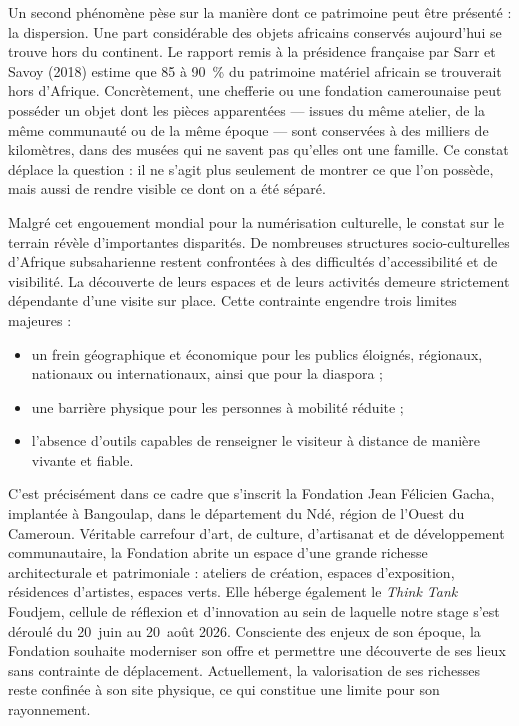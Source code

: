 Un second phénomène pèse sur la manière dont ce patrimoine peut être présenté :
la dispersion. Une part considérable des objets africains conservés aujourd'hui
se trouve hors du continent. Le rapport remis à la présidence française par
Sarr et Savoy (2018) estime que 85 à 90~\% du patrimoine matériel africain se
trouverait hors d'Afrique. Concrètement, une chefferie ou une fondation
camerounaise peut posséder un objet dont les pièces apparentées — issues du même
atelier, de la même communauté ou de la même époque — sont conservées à des
milliers de kilomètres, dans des musées qui ne savent pas qu'elles ont une
famille. Ce constat déplace la question : il ne s'agit plus seulement de montrer
ce que l'on possède, mais aussi de rendre visible ce dont on a été séparé.

Malgré cet engouement mondial pour la numérisation culturelle, le constat sur le
terrain révèle d'importantes disparités. De nombreuses structures
socio-culturelles d'Afrique subsaharienne restent confrontées à des difficultés
d'accessibilité et de visibilité. La découverte de leurs espaces et de leurs
activités demeure strictement dépendante d'une visite sur place. Cette
contrainte engendre trois limites majeures :

\begin{itemize}
  \item un frein géographique et économique pour les publics éloignés,
        régionaux, nationaux ou internationaux, ainsi que pour la diaspora ;
  \item une barrière physique pour les personnes à mobilité réduite ;
  \item l'absence d'outils capables de renseigner le visiteur à distance de
        manière vivante et fiable.
\end{itemize}

C'est précisément dans ce cadre que s'inscrit la Fondation Jean Félicien Gacha,
implantée à Bangoulap, dans le département du Ndé, région de l'Ouest du
Cameroun. Véritable carrefour d'art, de culture, d'artisanat et de développement
communautaire, la Fondation abrite un espace d'une grande richesse
architecturale et patrimoniale : ateliers de création, espaces d'exposition,
résidences d'artistes, espaces verts. Elle héberge également le \emph{Think
Tank} Foudjem, cellule de réflexion et d'innovation au sein de laquelle notre
stage s'est déroulé du 20~juin au 20~août 2026. Consciente des enjeux de son
époque, la Fondation souhaite moderniser son offre et permettre une découverte
de ses lieux sans contrainte de déplacement. Actuellement, la valorisation de
ses richesses reste confinée à son site physique, ce qui constitue une limite
pour son rayonnement.

